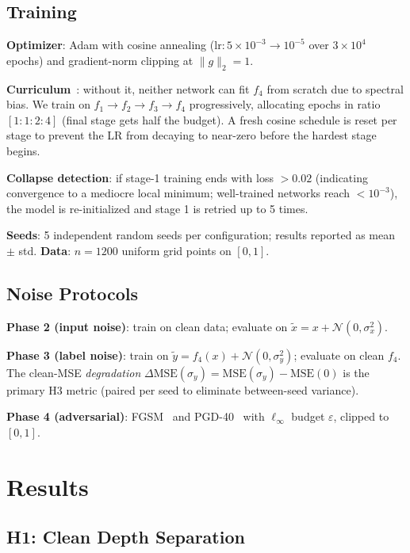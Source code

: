 \documentclass[10pt,twocolumn]{article}
\newcommand{\sigx}{\sigma_x}
\newcommand{\sigy}{\sigma_y}
\begin{document}
\subsection{Training}

\textbf{Optimizer}: Adam with cosine annealing ($\mathrm{lr}: 5\times10^{-3} \to 10^{-5}$
over $3\times10^4$ epochs) and gradient-norm clipping at $\|g\|_2 = 1$.

\textbf{Curriculum}~\citep{bengio2009curriculum}: without it, neither network can fit $f_4$
from scratch due to spectral bias. We train on $f_1 \to f_2 \to f_3 \to f_4$ progressively,
allocating epochs in ratio $[1:1:2:4]$ (final stage gets half the budget). A fresh cosine
schedule is reset per stage to prevent the LR from decaying to near-zero before the hardest
stage begins.

\textbf{Collapse detection}: if stage-1 training ends with loss $> 0.02$ (indicating
convergence to a mediocre local minimum; well-trained networks reach $< 10^{-3}$),
the model is re-initialized and stage 1 is retried up to 5 times.

\textbf{Seeds}: 5 independent random seeds per configuration; results reported as mean $\pm$ std.
\textbf{Data}: $n=1200$ uniform grid points on $[0,1]$.

\subsection{Noise Protocols}

\textbf{Phase 2 (input noise)}: train on clean data; evaluate on $\tilde{x} = x + \mathcal{N}(0,\sigx^2)$.

\textbf{Phase 3 (label noise)}: train on $\tilde{y} = f_4(x) + \mathcal{N}(0,\sigy^2)$; evaluate on clean $f_4$.
The clean-MSE \emph{degradation} $\Delta\mathrm{MSE}(\sigy) = \mathrm{MSE}(\sigy) - \mathrm{MSE}(0)$
is the primary H3 metric (paired per seed to eliminate between-seed variance).

\textbf{Phase 4 (adversarial)}: FGSM~\citep{goodfellow2015explaining} and
PGD-40~\citep{madry2018towards} with $\ell_\infty$ budget $\varepsilon$, clipped to $[0,1]$.

\section{Results}
\label{sec:results}

\subsection{H1: Clean Depth Separation}
\label{sec:h1}
\end{document}
